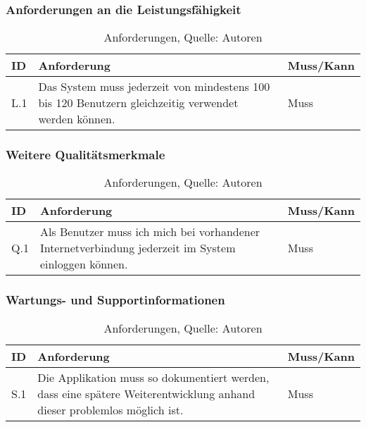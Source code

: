 \subsubsection{Anforderungen an die Leistungsfähigkeit}
\begin{table}[H]
    \setlength\extrarowheight{2pt} %
    \begin{tabularx}{\textwidth}{|l|X|l|}
        \hline
        \textbf{ID} &  \textbf{Anforderung} & \textbf{Muss/Kann}  \\
        \hline
        L.1 & Das System muss jederzeit von mindestens 100 bis 120 Benutzern gleichzeitig verwendet werden können. & Muss \\
        \hline
 \end{tabularx}
    \caption{ \label{tbl: Anforderungen an die Leistungsfaehigkeit}Anforderungen, Quelle: Autoren}
\end{table}
\subsubsection{Weitere Qualitätsmerkmale}
\begin{table}[H]
    \setlength\extrarowheight{2pt} %
    \begin{tabularx}{\textwidth}{|l|X|l|}
        \hline
        \textbf{ID} &  \textbf{Anforderung} & \textbf{Muss/Kann}  \\
        \hline
        Q.1 & Als Benutzer muss ich mich bei vorhandener Internetverbindung jederzeit im System einloggen können. & Muss \\
        \hline
    \end{tabularx}
    \caption{ \label{tbl: Anforderungen an die Qualitaet}Anforderungen, Quelle: Autoren}
\end{table}
\subsubsection{Wartungs- und Supportinformationen}
\begin{table}[H]
    \setlength\extrarowheight{2pt} %
    \begin{tabularx}{\textwidth}{|l|X|l|}
        \hline
        \textbf{ID} &  \textbf{Anforderung} & \textbf{Muss/Kann}  \\
        \hline
        S.1 & Die Applikation muss so dokumentiert werden, dass eine spätere Weiterentwicklung anhand dieser problemlos möglich ist. & Muss \\
        \hline
    \end{tabularx}
    \caption{ \label{tbl: Anforderungen an die Wartungen und den Support}Anforderungen, Quelle: Autoren}
\end{table}
